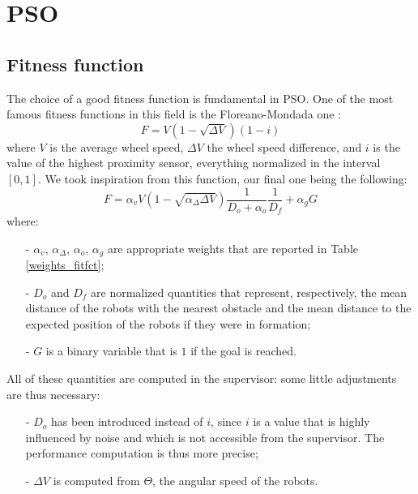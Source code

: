 \documentclass[journal]{IEEEtran}
\begin{document}



\section{PSO}
\label{sec:3}

\subsection{Fitness function}
The choice of a good fitness function is fundamental in PSO. One of the most famous fitness functions in this field is the Floreano-Mondada one \cite{IEEEhowto:fitness_floreano_mondada}:
\begin {equation}
F=V(1-\sqrt{\Delta V})(1-i)
\end{equation}
where $V$ is the average wheel speed, $\Delta V$ the wheel speed difference, and $i$ is the value of the highest proximity sensor, everything normalized in the interval $[0,1]$. We took inspiration from this function, our final one being the following: 
\begin {equation}
F=\alpha_vV(1-\sqrt{\alpha_{\Delta}\Delta V})\frac{1}{D_o+\alpha_o}\frac{1}{D_f}+\alpha_gG
\end{equation}
where:
\begin{itemize}
\item[-] $\alpha_v$, $\alpha_\Delta$, $\alpha_o$, $\alpha_g$ are appropriate weights that are reported in Table \ref{weights_fitfct};
\item[-] $D_o$ and $D_f$ are normalized quantities that represent, respectively, the mean distance of the robots with the nearest obstacle and the mean distance to the expected position of the robots if they were in formation; 
\item[-] $G$ is a binary variable that is $1$ if the goal is reached.
\end{itemize} 
All of these quantities are computed in the supervisor: some little adjustments are thus necessary: 
\begin{itemize}
\item[-] $D_o$ has been introduced instead of $i$, since $i$ is a value that is highly influenced by noise and which is not accessible from the supervisor. The performance computation is thus more precise;
\item[-] $\Delta V$ is computed from $\Theta$, the angular speed of the robots.
\end{itemize}
\end{document}
